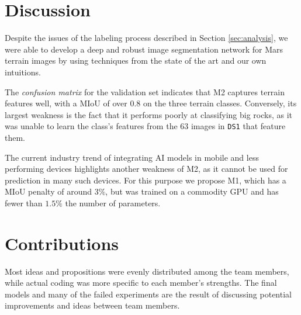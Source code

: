 \documentclass[11pt]{article}
\begin{document}
\begin{multicols}{2}
      \section{Discussion}

      Despite the issues of the labeling process described in Section \ref{sec:analysis}, we were able to develop a deep and robust image segmentation network for Mars terrain images by using techniques from the state of the art and our own intuitions. 
      
      The \textit{confusion matrix} for the validation set indicates that M2 captures terrain features well, with a MIoU of over $0.8$ on the three terrain classes. Conversely, its largest weakness is the fact that it performs poorly at classifying big rocks, as it was unable to learn the class's features from the $63$ images in \texttt{DS1} that feature them. 
      
      The current industry trend of integrating AI models in mobile and less performing devices highlights another weakness of M2, as it cannot be used for prediction in many such devices. For this purpose we propose M1, which has a MIoU penalty of around $3\%$, but was trained on a commodity GPU and has fewer than $1.5\%$ the number of parameters.

      \section{Contributions}

      Most ideas and propositions were evenly distributed among the team members, while actual coding was more specific to each member's strengths. The final models and many of the failed experiments are the result of discussing potential improvements and ideas between team members.


\end{multicols}
\end{document}
